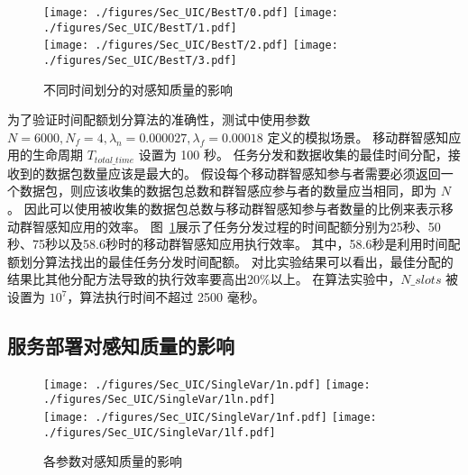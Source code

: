\begin{figure}[!b]
  \centering
  {\texttt{[image: ./figures/Sec\_UIC/BestT/0.pdf]}}
  {\texttt{[image: ./figures/Sec\_UIC/BestT/1.pdf]}}\\
  {\texttt{[image: ./figures/Sec\_UIC/BestT/2.pdf]}}
  {\texttt{[image: ./figures/Sec\_UIC/BestT/3.pdf]}}
  \vspace{-1em}
  \caption{不同时间划分的对感知质量的影响}
  \label{Figure_BestT}
\end{figure}

为了验证时间配额划分算法的准确性，测试中使用参数 $N=6000, N_f=4, \lambda_n = 0.000027, \lambda_f=0.00018$ 定义的模拟场景。
移动群智感知应用的生命周期 $T_{total\_time}$ 设置为 100 秒。
任务分发和数据收集的最佳时间分配，接收到的数据包数量应该是最大的。
假设每个移动群智感知参与者需要必须返回一个数据包，则应该收集的数据包总数和群智感应参与者的数量应当相同，即为 $N$。
因此可以使用被收集的数据包总数与移动群智感知参与者数量的比例来表示移动群智感知应用的效率。
图~\ref{Figure_BestT}展示了任务分发过程的时间配额分别为25秒、50秒、75秒以及58.6秒时的移动群智感知应用执行效率。
其中，58.6秒是利用时间配额划分算法找出的最佳任务分发时间配额。
对比实验结果可以看出，最佳分配的结果比其他分配方法导致的执行效率要高出20\%以上。
在算法实验中，$N\_slots$ 被设置为 $10^7$，算法执行时间不超过 2500 毫秒。



\subsection{服务部署对感知质量的影响}


\begin{figure}[!b]
  \centering
	{\texttt{[image: ./figures/Sec\_UIC/SingleVar/1n.pdf]}}
	{\texttt{[image: ./figures/Sec\_UIC/SingleVar/1ln.pdf]}}\\
	{\texttt{[image: ./figures/Sec\_UIC/SingleVar/1nf.pdf]}}
	{\texttt{[image: ./figures/Sec\_UIC/SingleVar/1lf.pdf]}}
	\vspace{-1em}
	\caption{各参数对感知质量的影响}
	\label{Figure_SingleValTest}
\end{figure}

